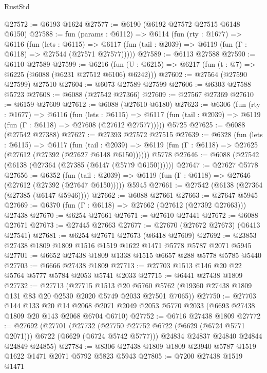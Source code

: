 \begin{lexlean}{RustStd}
\begin{coremodule}
@27572 := @6193 @1624
@27577 := @6190 (@6192 @27572 @27515 @6148 @6150)
@27588 := fun (params : @6112) =>
  @6114
    (fun (rty : @1677) =>
    @6116
      (fun (lets : @6115) =>
      @6117 (fun (tail : @2039) => @6119 (fun (Γ : @6118) => @27544 (@27571 @27577)))))
@27589 := @6113 @27588
@27590 := @6110 @27589
@27599 := @6216
    (fun (U : @6215) => @6217 (fun (t : @7) => @6225 (@6088 (@6231 @27512 @6106) @6242)))
@27602 := @27564 (@27590 @27599) @27510
@27604 := @6073 @27589 @27599
@27606 := @6303 @27588 @5723
@27608 := @6088 (@27542 @27366)
@27609 := @27567 @27369
@27610 := @6159 @27609
@27612 := @6088 (@27610 @6180)
@27623 := @6306
    (fun (rty : @1677) =>
    @6116
      (fun (lets : @6115) =>
      @6117 (fun (tail : @2039) => @6119 (fun (Γ : @6118) => @27608 (@27612 @27577)))))
    @5725
@27625 := @6088 (@27542 @27388)
@27627 := @27393 @27572 @27515
@27639 := @6328
    (fun (lets : @6115) =>
    @6117
      (fun (tail : @2039) =>
      @6119 (fun (Γ : @6118) => @27625 (@27612 (@27392 (@27627 @6148 @6150))))))
    @5778
@27646 := @6088 (@27542 (@6138 (@27364 (@27385 (@6147 (@5779 @6150))))))
@27647 := @27627 @5778
@27656 := @6352
    (fun (tail : @2039) => @6119 (fun (Γ : @6118) => @27646 (@27612 (@27392 (@27647 @6150)))))
    @5945
@27661 := @27542 (@6138 (@27364 (@27385 (@6147 @5946))))
@27662 := @6088 @27661
@27663 := @27647 @5945
@27669 := @6370 (fun (Γ : @6118) => @27662 (@27612 (@27392 @27663))) @27438
@27670 := @6254 @27661
@27671 := @27610 @27441
@27672 := @6088 @27671
@27673 := @27445 @27663
@27677 := @27670 (@27672 @27673) (@6413 @27541)
@27681 := @6254 @27671 @27673 (@6418 @27609)
@27692 := @23853 @27438 @1809 @1809 @1516 @1519 @1622 @1471 @5778 @5787 @2071 @5945
@27701 := @6652 @27438 @1809 @1338 @1515 @6657 @288 @5778 @5785 @5440
@27703 := @6666 @27438 @1809
@27713 := @27703 @1513 @146 @20 @22 @5764 @5777 @5784 @2053 @5741 @2033
@27715 := @6441 @27438 @1809
@27732 := @27713
    (@27715
      @1513
      @20
      @5760
      @5762
      (@19360 @27438 @1809 @131 @83 @20 @2530 @2020 @5749 @2033 @27501 @7065))
@27750 := @27703
    @144
    @133
    @20
    @14
    @2068
    @2071
    @2049
    @2053
    @5770
    @2033
    (@6693 @27438 @1809 @20 @143 @2068 @6704 @6710)
@27752 := @6716 @27438 @1809
@27772 := @27692
    (@27701
      (@27732 (@27750 @27752 @6722 (@6629 (@6724 @5771 @2071))) @6722 (@6629 (@6724 @5742 @5777)))
      @24834
      @24837
      @24840
      @24844
      @24849
      @24855)
@27784 := @8306 @27438 @1809 @1809 @23940 @5787 @1519 @1622 @1471 @2071 @5792 @5823 @5943
@27805 := @7200
    @27438
    @1519
    @1471

\end{coremodule}
\end{lexlean}
